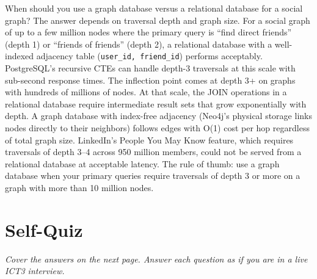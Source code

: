 \documentclass[11pt,a4paper]{article}
\begin{document}
\begin{curiobox}{When should you use a graph database versus a relational database for a social graph?}
The answer depends on traversal depth and graph size. For a social graph of up to a few million nodes where the primary query is ``find direct friends'' (depth 1) or ``friends of friends'' (depth 2), a relational database with a well-indexed adjacency table (\texttt{user\_id, friend\_id}) performs acceptably. PostgreSQL's recursive CTEs can handle depth-3 traversals at this scale with sub-second response times. The inflection point comes at depth 3+ on graphs with hundreds of millions of nodes. At that scale, the JOIN operations in a relational database require intermediate result sets that grow exponentially with depth. A graph database with index-free adjacency (Neo4j's physical storage links nodes directly to their neighbors) follows edges with O(1) cost per hop regardless of total graph size. LinkedIn's People You May Know feature, which requires traversals of depth 3--4 across 950 million members, could not be served from a relational database at acceptable latency. The rule of thumb: use a graph database when your primary queries require traversals of depth 3 or more on a graph with more than 10 million nodes.
\end{curiobox}

\section{Self-Quiz}

\textit{Cover the answers on the next page. Answer each question as if you are in a live ICT3 interview.}

\bigskip
\end{document}
